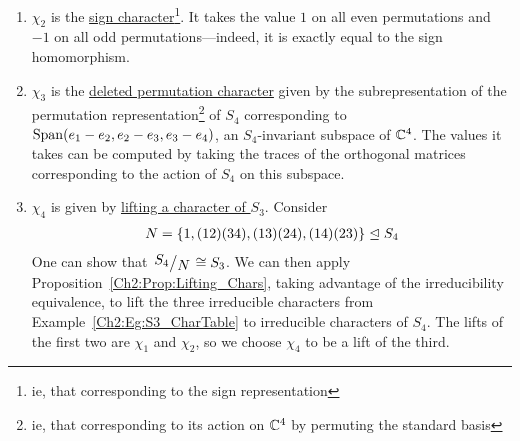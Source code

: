 \begin{boxexample}[$S_4$]
\begin{enumerate}
        \item $\chi_2$ is the \underline{sign character}\footnote{ie, that corresponding to the sign representation}. It takes the value $1$ on all even permutations and $-1$ on all odd permutations---indeed, it is exactly equal to the sign homomorphism.
        
        \item $\chi_3$ is the \underline{deleted permutation character} given by the subrepresentation of the permutation representation\footnote{ie, that corresponding to its action on $\mathbb{C}^4$ by permuting the standard basis} of $S_4$ corresponding to $\operatorname{Span}\!\left( e_1 - e_2, e_2 - e_3, e_3 - e_4 \right)$, an $S_4$-invariant subspace of $\mathbb{C}^4$. The values it takes can be computed by taking the traces of the orthogonal matrices corresponding to the action of $S_4$ on this subspace.
        
        \item $\chi_4$ is given by \underline{lifting a character of $S_3$}. Consider
        \begin{align*}
            N = \left\{ 1, (12)(34), (13)(24), (14)(23) \right\} \trianglelefteq S_4
        \end{align*}
        One can show that $\quotient{S_4}{N} \cong S_3$. We can then apply Proposition~\ref{Ch2:Prop:Lifting_Chars}, taking advantage of the irreducibility equivalence, to lift the three irreducible characters from Example~\ref{Ch2:Eg:S3_CharTable} to irreducible characters of $S_4$. The lifts of the first two are $\chi_1$ and $\chi_2$, so we choose $\chi_4$ to be a lift of the third.
        

\end{enumerate}
\end{boxexample}
